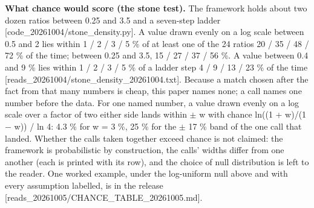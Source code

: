 \documentclass[11pt]{article}
\begin{document}
\textbf{What chance would score (the stone test).} The framework holds about two dozen ratios between 0.25 and 3.5 and a seven-step ladder {[}code\_20261004/stone\_density.py{]}. A value drawn evenly on a log scale between 0.5 and 2 lies within 1 / 2 / 3 / 5 \% of at least one of the 24 ratios 20 / 35 / 48 / 72 \% of the time; between 0.25 and 3.5, 15 / 27 / 37 / 56 \%. A value between 0.4 and 9 \% lies within 1 / 2 / 3 / 5 \% of a ladder step 4 / 9 / 13 / 23 \% of the time {[}reads\_20261004/stone\_density\_20261004.txt{]}. Because a match chosen after the fact from that many numbers is cheap, this paper names none; a call names one number before the data. For one named number, a value drawn evenly on a log scale over a factor of two either side lands within \(\pm\) w with chance ln((1 + w)/(1 \(-\) w)) / ln 4: 4.3 \% for w = 3 \%, 25 \% for the \(\pm\) 17 \% band of the one call that landed. Whether the calls taken together exceed chance is not claimed: the framework is probabilistic by construction, the calls' widths differ from one another (each is printed with its row), and the choice of null distribution is left to the reader. One worked example, under the log-uniform null above and with every assumption labelled, is in the release {[}reads\_20261005/CHANCE\_TABLE\_20261005.md{]}.
\end{document}

